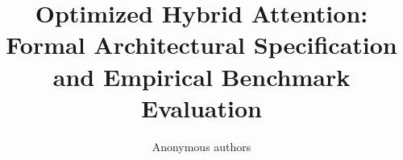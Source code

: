 \title{\textbf{Optimized Hybrid Attention: Formal Architectural Specification and Empirical Benchmark Evaluation}}

\author{Anonymous authors}
